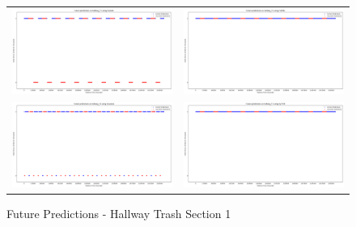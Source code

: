 \begin{figure}
  \begin{tabular}{cc}
    {\includegraphics[width = 3in]{images/results/Future_hallway_T1_Duckett.png}} &
    {\includegraphics[width = 3in]{images/results/Future_hallway_T1_FreMEn.png}} \\
    {\includegraphics[width = 3in]{images/results/Future_hallway_T1_Gaussian.png}} &
    {\includegraphics[width = 3in]{images/results/Future_hallway_T1_HyT-EM.png}} \\
  \end{tabular}
  \caption{Future Predictions - Hallway Trash Section 1}
\end{figure}\\ \\

